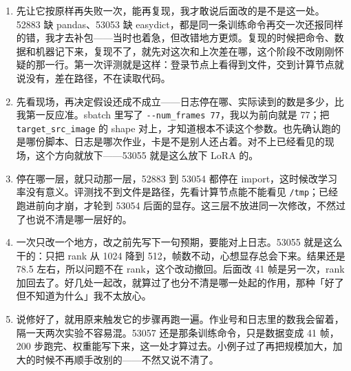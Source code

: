 \documentclass[UTF8,a4paper,11pt,fontset=none]{ctexart}
\begin{document}
\begin{enumerate}[leftmargin=1.6em, itemsep=0.55em, parsep=0.15em, topsep=0.4em]
\item 先让它按原样再失败一次，能再复现，我才敢说后面改的是不是这一处。52883 缺 pandas、53053 缺 easydict，都是同一条训练命令再交一次还报同样的错，我才去补包——当时也着急，但改错地方更烦。复现的时候把命令、数据和机器记下来，复现不了，就先对这次和上次差在哪，这个阶段不改刚刚怀疑的那一行。第一次评测就是这样：登录节点上看得到文件，交到计算节点就说没有，差在路径，不在读取代码。

\item 先看现场，再决定假设还成不成立——日志停在哪、实际读到的数是多少，比我第一反应准。sbatch 里写了 \verb|--num_frames 77|，我以为前向就是 77；把 \texttt{target\_src\_image} 的 shape 对上，才知道根本不读这个参数。也先确认跑的是哪份脚本、日志是哪次作业，卡是不是别人还占着。对不上已经看见的现场，这个方向就放下——53055 就是这么放下 LoRA 的。

\item 停在哪一层，就只动那一层，52883 到 53054 都停在 import，这时候改学习率没有意义。评测找不到文件是路径，先看计算节点能不能看见 \texttt{/tmp}；已经跑进前向才崩，才轮到 53054 后面的显存。这三层不放进同一次修改，不然过了也说不清是哪一层好的。

\item 一次只改一个地方，改之前先写下一句预期，要能对上日志。53055 就是这么干的：只把 rank 从 1024 降到 512，帧数不动，心想显存总会下来。结果还是 78.5 左右，所以问题不在 rank，这个改动撤回。后面改 41 帧是另一次，rank 加回去了。好几处一起改，就算过了也分不清是哪一处起的作用，那种「好了但不知道为什么」我不太放心。

\item 说修好了，就用原来触发它的步骤再跑一遍。作业号和日志里的数我会留着，隔一天两次实验不容易混。53057 还是那条训练命令，只是数据变成 41 帧，200 步跑完、权重能写下来，这一处才算过去。小例子过了再把规模加大，加大的时候不再顺手改别的——不然又说不清了。
\end{enumerate}
\end{document}
